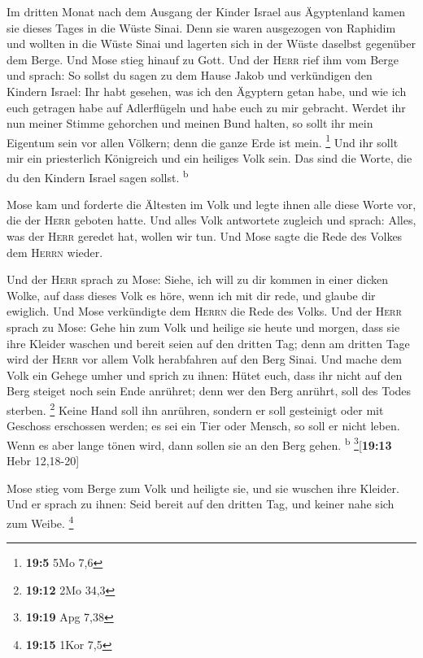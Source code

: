  Im dritten Monat nach dem Ausgang der Kinder Israel aus
Ägyptenland kamen sie dieses Tages in die Wüste Sinai. 
Denn sie waren ausgezogen von Raphidim und wollten in die Wüste Sinai
und lagerten sich in der Wüste daselbst gegenüber dem Berge.
 Und Mose stieg hinauf zu Gott. Und der \textsc{Herr} rief
ihm vom Berge und sprach: So sollst du sagen zu dem Hause Jakob und
verkündigen den Kindern Israel:  Ihr habt gesehen, was ich
den Ägyptern getan habe, und wie ich euch getragen habe auf Adlerflügeln
und habe euch zu mir gebracht.  Werdet ihr nun meiner
Stimme gehorchen und meinen Bund halten, so sollt ihr mein Eigentum sein
vor allen Völkern; denn die ganze Erde ist mein. \footnote{\textbf{19:5}
  5Mo 7,6}  Und ihr sollt mir ein priesterlich Königreich
und ein heiliges Volk sein. Das sind die Worte, die du den Kindern
Israel sagen sollst. \textsuperscript{b}

 Mose kam und forderte die Ältesten im Volk und legte
ihnen alle diese Worte vor, die der \textsc{Herr} geboten hatte.
 Und alles Volk antwortete zugleich und sprach: Alles, was
der \textsc{Herr} geredet hat, wollen wir tun. Und Mose sagte die Rede
des Volkes dem \textsc{Herrn} wieder.

 Und der \textsc{Herr} sprach zu Mose: Siehe, ich will zu
dir kommen in einer dicken Wolke, auf dass dieses Volk es höre, wenn ich
mit dir rede, und glaube dir ewiglich. Und Mose verkündigte dem
\textsc{Herrn} die Rede des Volks.  Und der \textsc{Herr}
sprach zu Mose: Gehe hin zum Volk und heilige sie heute und morgen, dass
sie ihre Kleider waschen  und bereit seien auf den
dritten Tag; denn am dritten Tage wird der \textsc{Herr} vor allem Volk
herabfahren auf den Berg Sinai.  Und mache dem Volk ein
Gehege umher und sprich zu ihnen: Hütet euch, dass ihr nicht auf den
Berg steiget noch sein Ende anrühret; denn wer den Berg anrührt, soll
des Todes sterben. \footnote{\textbf{19:12} 2Mo 34,3} 
Keine Hand soll ihn anrühren, sondern er soll gesteinigt oder mit
Geschoss erschossen werden; es sei ein Tier oder Mensch, so soll er
nicht leben. Wenn es aber lange tönen wird, dann sollen sie an den Berg
gehen. \textsuperscript{b} \footnote{\textbf{19:19} Apg 7,38}{[}\textbf{19:13}
Hebr 12,18-20{]}

 Mose stieg vom Berge zum Volk und heiligte sie, und sie
wuschen ihre Kleider.  Und er sprach zu ihnen: Seid
bereit auf den dritten Tag, und keiner nahe sich zum Weibe. \footnote{\textbf{19:15}
  1Kor 7,5}


